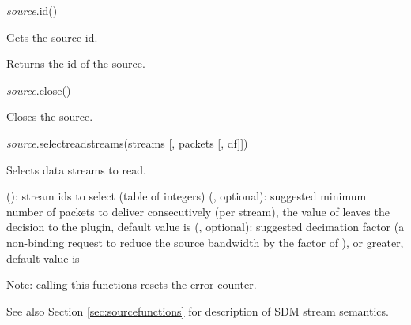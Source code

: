 \documentclass[a4paper,12pt,twoside,extrafontsizes]{memoir}
\begin{document}
\begin{luafuncprototype}
\emph{source}.id()
\end{luafuncprototype}

\begin{funcdescr}
	Gets the source id.
\end{funcdescr}

\begin{funcret}
	Returns the id of the source.
\end{funcret}


\begin{luafuncprototype}
\emph{source}.close()
\end{luafuncprototype}

\begin{funcdescr}
	Closes the source.
\end{funcdescr}


\begin{luafuncprototype}
\emph{source}.selectreadstreams(streams [, packets [, df]])
\end{luafuncprototype}

\begin{funcdescr}
	Selects data streams to read.
\end{funcdescr}

\begin{funcparams}
	 (): stream ids to select (table of integers)
	 (, optional): suggested minimum number of packets to deliver consecutively (per stream), the value of  leaves the decision to the plugin, default value is 
	 (, optional): suggested decimation factor (a non-binding request to reduce the source bandwidth by the factor of ),  or greater, default value is 
\end{funcparams}

\begin{funcremarks}
	Note: calling this functions resets the error counter.
	
	See also Section \ref{sec:sourcefunctions} for description of SDM stream semantics.
\end{funcremarks}

\end{document}

